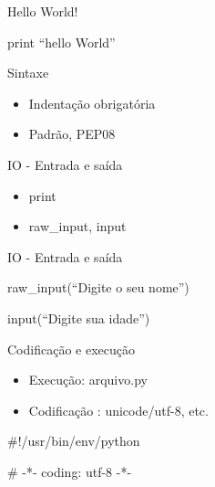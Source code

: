 \documentclass{beamer}
\begin{document}
\begin{frame}{Hello World!}
\begin{Example}
print ``hello World''
\end{Example}

\end{frame}

\begin{frame}{Sintaxe}
 \begin{itemize}
  \item Indenta\c{c}\~ao obrigat\'oria
  \item Padr\~ao, PEP08
 \end{itemize}

\end{frame}

\begin{frame}{IO - Entrada e sa\'ida}
 \begin{itemize}
  \item print
  \item raw\_input, input
 \end{itemize}

\end{frame}

\begin{frame}{IO - Entrada e sa\'ida}
\begin{Example}
  raw\_input(``Digite o seu nome'')
\end{Example}

\begin{Example}
input(``Digite sua idade'')
\end{Example}

\end{frame}

\begin{frame}{Codifica\c{c}\~ao e execu\c{c}\~ao}
 
 \begin{itemize}
  \item Execu\c{c}\~ao: arquivo.py
  \item Codifica\c{c}\~ao : unicode/utf-8, etc.
 \end{itemize}
 
 \begin{Example}
  \#!/usr/bin/env/python
 \end{Example}
\begin{Example}
 \# -*- coding: utf-8 -*-
\end{Example}


\end{frame}
\end{document}
